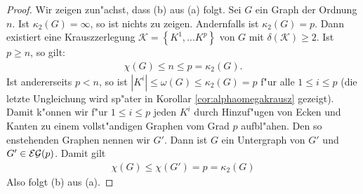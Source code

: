 \begin{proof}
  Wir zeigen zun"achst, dass (b) aus (a) folgt. Sei $G$ ein Graph der Ordnung $n$. Ist $\kappa_{2}(G) = \infty$, so ist nichts zu zeigen. Andernfalls ist $\kappa_{2}(G) =p$. Dann existiert eine Krauszzerlegung $\mathcal{K} = \left\{ K^1,\dots K^p \right\}$ von $G$ mit $\delta(\mathcal{K}) \geq 2$. Ist $p \geq n$, so gilt:
  \begin{align*}
    \chi(G) \leq n \leq p = \kappa_2 (G).
  \end{align*}
  Ist andererseits $p< n $, so ist $|K^{i}| \leq \omega (G)  \leq \kappa_2 (G) =  p$ f"ur alle $1\leq i \leq p$ (die letzte Ungleichung wird sp"ater in Korollar \ref{cor:alphaomegakrausz} gezeigt). Damit k"onnen wir f"ur $1\leq i \leq p$ jeden $K^{i}$ durch Hinzuf"ugen von Ecken und Kanten zu einem vollst"andigen Graphen vom Grad $p$ aufbl"ahen. Den so enstehenden Graphen nennen wir $G'$. Dann ist $G$ ein Untergraph von $G'$ und $G'\in {\cal EG}(p)$. Damit gilt 
  \begin{align*}
    \chi(G) \leq \chi (G') = p = \kappa_{2}(G)
  \end{align*}
  Also folgt (b) aus (a).  


\end{proof}
